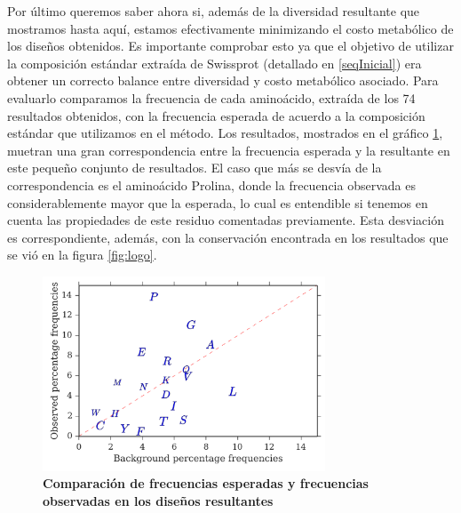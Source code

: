 Por último queremos saber ahora si, además de la diversidad resultante que mostramos hasta aquí, estamos efectivamente minimizando el costo metabólico de los diseños obtenidos.
Es importante comprobar esto ya que el objetivo de utilizar la composición estándar extraída de Swissprot (detallado en \ref{seqInicial}) era obtener un correcto balance entre diversidad y costo metabólico asociado.
Para evaluarlo comparamos la frecuencia de cada aminoácido, extraída de los 74 resultados obtenidos, con la frecuencia esperada de acuerdo a la composición estándar que utilizamos en el método.
Los resultados, mostrados en el gráfico \ref{fig:frequencies}, muetran una gran correspondencia entre la frecuencia esperada y la resultante en este pequeño conjunto de resultados.
El caso que más se desvía de la correspondencia es el aminoácido Prolina, donde la frecuencia observada es considerablemente mayor que la esperada, lo cual es entendible si tenemos en cuenta las propiedades 
de este residuo comentadas previamente. Esta desviación es correspondiente, además, con la conservación encontrada en los resultados que se vió en la figura \ref{fig:logo}.





\begin{figure}[htbp]
\centering
\includegraphics[width=0.75\textwidth]{img/resultados/frequenciesComparison.png}
\caption{\textbf{Comparación de frecuencias esperadas y frecuencias observadas en los diseños resultantes}}
\label{fig:frequencies}
\end{figure}
